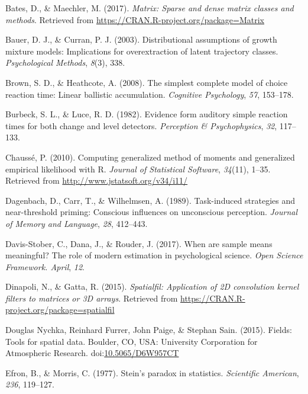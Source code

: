 \documentclass[english,man]{apa6}
\theoremstyle{definition}
\theoremstyle{definition}
\theoremstyle{remark}
\begin{document}
\hypertarget{ref-R-Matrix}{}
Bates, D., \& Maechler, M. (2017). \emph{Matrix: Sparse and dense matrix
classes and methods}. Retrieved from
\url{https://CRAN.R-project.org/package=Matrix}

\hypertarget{ref-Bauer:Curran:2003}{}
Bauer, D. J., \& Curran, P. J. (2003). Distributional assumptions of
growth mixture models: Implications for overextraction of latent
trajectory classes. \emph{Psychological Methods}, \emph{8}(3), 338.

\hypertarget{ref-Brown:Heathcote:2008}{}
Brown, S. D., \& Heathcote, A. (2008). The simplest complete model of
choice reaction time: Linear ballistic accumulation. \emph{Cognitive
Psychology}, \emph{57}, 153--178.

\hypertarget{ref-Burbeck:Luce:1982}{}
Burbeck, S. L., \& Luce, R. D. (1982). Evidence form auditory simple
reaction times for both change and level detectors. \emph{Perception \&
Psychophysics}, \emph{32}, 117--133.

\hypertarget{ref-R-gmm}{}
Chaussé, P. (2010). Computing generalized method of moments and
generalized empirical likelihood with R. \emph{Journal of Statistical
Software}, \emph{34}(11), 1--35. Retrieved from
\url{http://www.jstatsoft.org/v34/i11/}

\hypertarget{ref-Dagenbach:etal:1989}{}
Dagenbach, D., Carr, T., \& Wilhelmsen, A. (1989). Task-induced
strategies and near-threshold priming: Conscious influences on
unconscious perception. \emph{Journal of Memory and Language},
\emph{28}, 412--443.

\hypertarget{ref-Davis:etal:2017}{}
Davis-Stober, C., Dana, J., \& Rouder, J. (2017). When are sample means
meaningful? The role of modern estimation in psychological science.
\emph{Open Science Framework. April}, \emph{12}.

\hypertarget{ref-R-spatialfil}{}
Dinapoli, N., \& Gatta, R. (2015). \emph{Spatialfil: Application of 2D
convolution kernel filters to matrices or 3D arrays}. Retrieved from
\url{https://CRAN.R-project.org/package=spatialfil}

\hypertarget{ref-R-fields}{}
Douglas Nychka, Reinhard Furrer, John Paige, \& Stephan Sain. (2015).
Fields: Tools for spatial data. Boulder, CO, USA: University Corporation
for Atmospheric Research.
doi:\href{https://doi.org/10.5065/D6W957CT}{10.5065/D6W957CT}

\hypertarget{ref-Efron:Morris:1977}{}
Efron, B., \& Morris, C. (1977). Stein's paradox in statistics.
\emph{Scientific American}, \emph{236}, 119--127.
\end{document}

